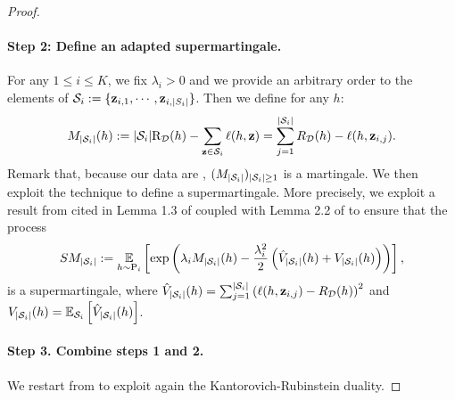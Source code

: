 \begin{noaddcontents}
\begin{proof}
    \paragraph{Step 2: Define an adapted supermartingale.}
        For any $1\leq i \leq K$, we fix $\lambda_i>0$ and we provide an arbitrary order to the elements of $\S_i\defeq \{\z_{i,1},\cdots,\z_{i,|S_i|}\}$. Then we define for any $h$: 
        \begin{align*}
        M_{|\S_i|}(h)\defeq   |\S_i|\Risk_{\D}(h) - \sum_{\z\in\S_i} \loss(h, \z) = \sum_{j=1}^{|\S_i|} R_\D(h) - \loss(h,\z_{i,j}).
        \end{align*}
        Remark that, because our data are \iid, $(M_{|\S_i|})_{|\S_i|\geq 1}$ is a martingale.
        We then exploit the technique \cite{haddouche2023pac} to define a supermartingale.
        More precisely, we exploit a result from \cite{bercu2008exponential} cited in Lemma 1.3 of \cite{haddouche2023pac} coupled with Lemma 2.2 of \cite{haddouche2023pac} to ensure that the process
        \begin{align*}
        SM_{|\S_i|} \defeq \EE_{h\sim \P_i} \LB\exp\left(\lambda_i M_{|\S_i|}(h) - \frac{\lambda_i^2}{2}\left( \Vhat_{|\S_i|}(h) + V_{|\S_i|}(h) \right)\right)\RB,
        \end{align*}
        is a supermartingale, where $\Vhat_{|\S_i|}(h)= \sum_{j=1}^{|\S_i|} \left(\loss(h,\z_{i,j}) - R_\D(h)\right)^2$ and $V_{|\S_i|}(h) = \EE_{\S_i} \LB \Vhat_{|\S_i|}(h) \RB $.
    
    
    
    \paragraph{Step 3. Combine steps 1 and 2.}
        
        We restart from  to exploit again the Kantorovich-Rubinstein duality.
    

\end{proof}
\end{noaddcontents}
